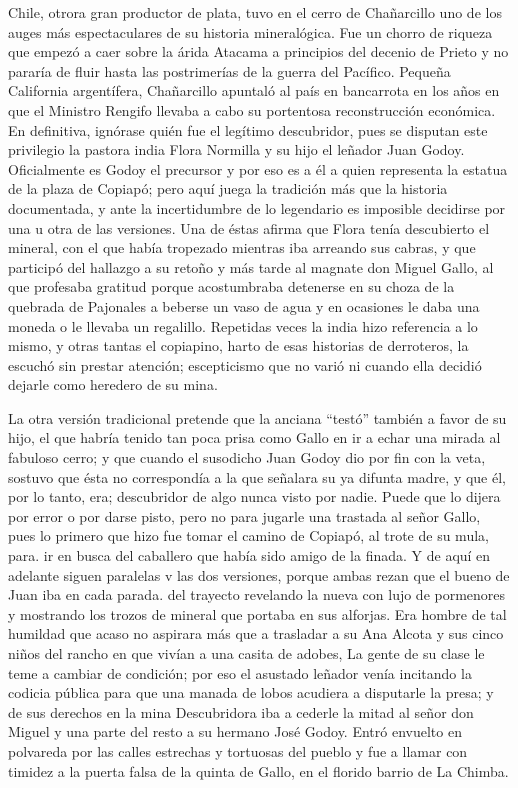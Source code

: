 \documentclass[10pt,twoside,openright]{memoir}
\begin{document}
Chile, otrora gran productor de plata, tuvo en el cerro de Chañarcillo
uno de los auges más espectaculares de su historia mineralógica. Fue un
chorro de riqueza que empezó a caer sobre la árida Atacama a principios
del decenio de Prieto y no pararía de fluir hasta las postrimerías de la
guerra del Pacífico. Pequeña California argentífera, Chañarcillo
apuntaló al país en bancarrota en los años en que el Ministro Rengifo
llevaba a cabo su portentosa reconstrucción económica. En definitiva,
ignórase quién fue el legítimo descubridor, pues se disputan este
privilegio la pastora india Flora Normilla y su hijo el leñador Juan
Godoy. Oficialmente es Godoy el precursor y por eso es a él a quien
representa la estatua de la plaza de Copiapó; pero aquí juega la
tradición más que la historia documentada, y ante la incertidumbre de lo
legendario es imposible decidirse por una u otra de las versiones. Una
de éstas afirma que Flora tenía descubierto el mineral, con el que había
tropezado mientras iba arreando sus cabras, y que participó del hallazgo
a su retoño y más tarde al magnate don Miguel Gallo, al que profesaba
gratitud porque acostumbraba detenerse en su choza de la quebrada de
Pajonales a beberse un vaso de agua y en ocasiones le daba una moneda o
le llevaba un regalillo. Repetidas veces la india hizo referencia a lo
mismo, y otras tantas el copiapino, harto de esas historias de
derroteros, la escuchó sin prestar atención; escepticismo que no varió
ni cuando ella decidió dejarle como heredero de su mina.

La otra versión tradicional pretende que la anciana ``testó'' también a
favor de su hijo, el que habría tenido tan poca prisa como Gallo en ir a
echar una mirada al fabuloso cerro; y que cuando el susodicho Juan Godoy
dio por fin con la veta, sostuvo que ésta no correspondía a la que
señalara su ya difunta madre, y que él, por lo tanto, era; descubridor
de algo nunca visto por nadie. Puede que lo dijera por error o por darse
pisto, pero no para jugarle una trastada al señor Gallo, pues lo primero
que hizo fue tomar el camino de Copiapó, al trote de su mula, para. ir
en busca del caballero que había sido amigo de la finada. Y de aquí en
adelante siguen paralelas v las dos versiones, porque ambas rezan que el
bueno de Juan iba en cada parada. del trayecto revelando la nueva con
lujo de pormenores y mostrando los trozos de mineral que portaba en sus
alforjas. Era hombre de tal humildad que acaso no aspirara más que a
trasladar a su Ana Alcota y sus cinco niños del rancho en que vivían a
una casita de adobes, La gente de su clase le teme a cambiar de
condición; por eso el asustado leñador venía incitando la codicia
pública para que una manada de lobos acudiera a disputarle la presa; y
de sus derechos en la mina Descubridora iba a cederle la mitad al señor
don Miguel y una parte del resto a su hermano José Godoy. Entró envuelto
en polvareda por las calles estrechas y tortuosas del pueblo y fue a
llamar con timidez a la puerta falsa de la quinta de Gallo, en el
florido barrio de La Chimba.
\end{document}
